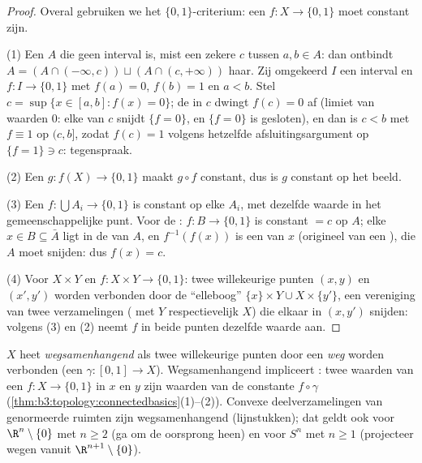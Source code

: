 \begin{proof}
Overal gebruiken we het $\{0,1\}$-criterium: een  $f
\colon X \to \{0,1\}$ moet constant zijn.

(1) Een $A$ die geen interval is, mist een zekere $c$ tussen $a, b
\in A$: dan ontbindt $A = (A \cap (-\infty, c)) \sqcup (A \cap (c,
+\infty))$ haar. Zij omgekeerd $I$ een interval en $f \colon I \to
\{0,1\}$  met $f(a) = 0$, $f(b) = 1$ en $a < b$. Stel $c =
\sup\{x \in [a,b] : f(x) = 0\}$; de  in $c$ dwingt
$f(c) = 0$ af (limiet van waarden $0$: elke  van $c$
snijdt $\{f = 0\}$, en $\{f=0\}$ is gesloten), en dan is $c < b$
met $f \equiv 1$ op $(c, b]$, zodat $f(c) = 1$ volgens hetzelfde
afsluitingsargument op $\{f = 1\} \ni c$: tegenspraak.

(2) Een  $g \colon f(X) \to \{0,1\}$ maakt $g \circ f$
constant, dus is $g$ constant op het beeld.

(3) Een  $f\colon \bigcup A_i \to \{0,1\}$ is constant op
elke $A_i$, met dezelfde waarde in het gemeenschappelijke punt.
Voor de : $f \colon B \to \{0,1\}$ is constant $= c$ op
$A$; elke $x \in B \subseteq \bar A$ ligt in de  van
$A$, en $f^{-1}(f(x))$ is een  van $x$ (origineel van een
), die $A$ moet snijden: dus $f(x) = c$.

(4) Voor $X \times Y$ en $f\colon X\times Y \to \{0,1\}$: twee
willekeurige punten $(x,y)$ en $(x',y')$ worden verbonden door de
``elleboog'' $\{x\}\times Y \cup X \times \{y'\}$, een vereniging
van twee  verzamelingen ( met $Y$
respectievelijk $X$) die elkaar in $(x, y')$ snijden: volgens (3)
en (2) neemt $f$ in beide punten dezelfde waarde aan.
\end{proof}

\begin{definition}\label{def:b3:topology:pathconnected}
$X$ heet \emph{wegsamenhangend} als
twee willekeurige punten door een \emph{weg} worden verbonden (een
 $\gamma \colon [0,1] \to X$). Wegsamenhangend impliceert
: twee waarden van een  $f \colon X \to \{0,
1\}$ in $x$ en $y$ zijn waarden van de constante $f\circ\gamma$
(\cref{thm:b3:topology:connectedbasics}(1)--(2)). Convexe
deelverzamelingen van genormeerde ruimten zijn wegsamenhangend
(lijnstukken); dat geldt ook voor $\R^n \setminus \{0\}$ met $n
\geq 2$ (ga om de oorsprong heen) en voor $S^n$ met $n \geq 1$
(projecteer wegen vanuit $\R^{n+1}\setminus \{0\}$).
\end{definition}

